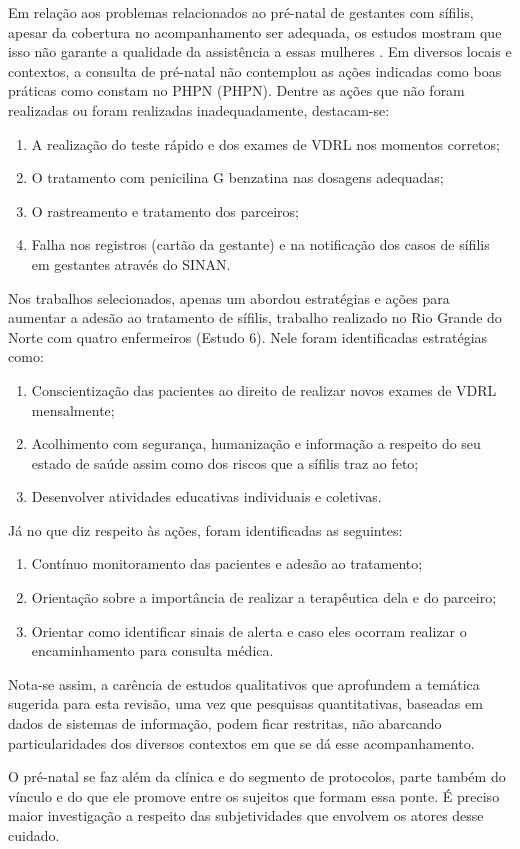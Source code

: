 Em relação aos problemas relacionados ao pré-natal  de gestantes com sífilis, apesar da cobertura no acompanhamento ser adequada, os estudos mostram que isso não garante a qualidade da assistência a essas mulheres \cite{tavares2012monitoramento,da2013sifilis,segatto2015evaluation}. Em diversos locais e contextos, a consulta de pré-natal não contemplou as ações indicadas como boas práticas como constam no \acrlong{PHPN} (\acrshort{PHPN}). Dentre as ações que não foram realizadas ou foram realizadas inadequadamente, destacam-se: 

\begin{enumerate}
\item A realização do teste rápido e dos exames de \acrshort{VDRL} nos momentos corretos;
\item O tratamento com penicilina G benzatina nas dosagens adequadas; 
\item O rastreamento e tratamento dos parceiros;
\item Falha nos registros (cartão da gestante) e na notificação dos casos de sífilis em gestantes através do \acrshort{SINAN}.
\end{enumerate}

Nos trabalhos selecionados, apenas um abordou estratégias e ações para aumentar a adesão ao tratamento de sífilis, trabalho realizado no Rio Grande do Norte com quatro enfermeiros (Estudo 6). Nele foram identificadas estratégias como: 

\begin{enumerate}
\item Conscientização das pacientes ao direito de realizar novos exames de VDRL mensalmente;
\item Acolhimento com segurança, humanização e informação a respeito do seu estado de saúde assim como dos riscos que a sífilis traz ao feto;
\item Desenvolver atividades educativas individuais e coletivas.
\end{enumerate}

Já no que diz respeito às ações, foram identificadas as seguintes: 

\begin{enumerate}
\item Contínuo monitoramento das pacientes e adesão ao tratamento; 
\item Orientação sobre a importância de realizar a terapêutica dela e do parceiro;
\item Orientar como identificar sinais de alerta e caso eles ocorram realizar o encaminhamento para consulta médica. 
\end{enumerate}

Nota-se assim, a carência de estudos qualitativos que aprofundem a temática sugerida para esta revisão, uma vez que pesquisas quantitativas, baseadas em dados de sistemas de informação, podem ficar restritas, não abarcando particularidades dos diversos contextos em que se dá esse acompanhamento. 

O pré-natal se faz além da clínica e do segmento de protocolos, parte também do vínculo e do que ele promove entre os sujeitos que formam essa ponte. É preciso maior investigação a respeito das subjetividades que envolvem os atores desse cuidado. 
